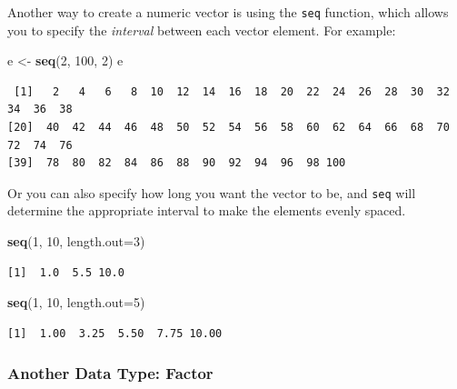 \documentclass[
]{book}
\newenvironment{Shaded}{\begin{snugshade}}{\end{snugshade}}
\newcommand{\DataTypeTok}[1]{\textcolor[rgb]{0.13,0.29,0.53}{#1}}
\newcommand{\DecValTok}[1]{\textcolor[rgb]{0.00,0.00,0.81}{#1}}
\newcommand{\KeywordTok}[1]{\textcolor[rgb]{0.13,0.29,0.53}{\textbf{#1}}}
\newcommand{\NormalTok}[1]{#1}
\newcommand{\StringTok}[1]{\textcolor[rgb]{0.31,0.60,0.02}{#1}}
\begin{document}
Another way to create a numeric vector is using the \texttt{seq} function, which allows you to specify the \emph{interval} between each vector element.
For example:

\begin{Shaded}
\begin{Highlighting}[]
\NormalTok{e <-}\StringTok{ }\KeywordTok{seq}\NormalTok{(}\DecValTok{2}\NormalTok{, }\DecValTok{100}\NormalTok{, }\DecValTok{2}\NormalTok{)}
\NormalTok{e}
\end{Highlighting}
\end{Shaded}

\begin{verbatim}
 [1]   2   4   6   8  10  12  14  16  18  20  22  24  26  28  30  32  34  36  38
[20]  40  42  44  46  48  50  52  54  56  58  60  62  64  66  68  70  72  74  76
[39]  78  80  82  84  86  88  90  92  94  96  98 100
\end{verbatim}

Or you can also specify how long you want the vector to be, and \texttt{seq} will determine the appropriate interval to make the elements evenly spaced.

\begin{Shaded}
\begin{Highlighting}[]
\KeywordTok{seq}\NormalTok{(}\DecValTok{1}\NormalTok{, }\DecValTok{10}\NormalTok{, }\DataTypeTok{length.out=}\DecValTok{3}\NormalTok{)}
\end{Highlighting}
\end{Shaded}

\begin{verbatim}
[1]  1.0  5.5 10.0
\end{verbatim}

\begin{Shaded}
\begin{Highlighting}[]
\KeywordTok{seq}\NormalTok{(}\DecValTok{1}\NormalTok{, }\DecValTok{10}\NormalTok{, }\DataTypeTok{length.out=}\DecValTok{5}\NormalTok{)}
\end{Highlighting}
\end{Shaded}

\begin{verbatim}
[1]  1.00  3.25  5.50  7.75 10.00
\end{verbatim}

\hypertarget{another-data-type-factor}{%
\subsubsection{Another Data Type: Factor}\label{another-data-type-factor}}
\end{document}
